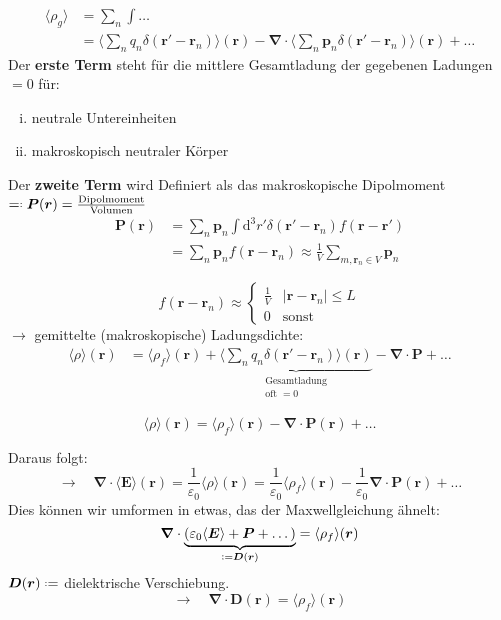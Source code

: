 \documentclass[titlepage,11pt,a4paper,ngerman]{report}
\newcommand*{\defeq}{\mathrel{\vcenter{\baselineskip0.5ex \lineskiplimit0pt \hbox{\scriptsize.}\hbox{\scriptsize.}}}=}
\newcommand*{\eqdef}{=\mathrel{\vcenter{\baselineskip0.5ex \lineskiplimit0pt \hbox{\scriptsize.}\hbox{\scriptsize.}}}}
\newcommand{\tx}[1]{\textrm{#1}}
\newcommand{\ub}[1]{\underbrace{#1}}
\newcommand{\dd}{\tx{d}}
\renewcommand{\vec}[1]{\boldsymbol{#1}}
\renewcommand{\epsilon}{\varepsilon}
\newcommand{\vabla}{\boldsymbol{\nabla}}
\newcommand{\frbox}[2]{\begin{tcolorbox}[colback=white,colframe=red!75!black,fonttitle=\bfseries,title=#1]#2\end{tcolorbox}}
\begin{document}
\begin{align*}
\langle \rho_g \rangle &= \sum_n \int \dots \\
&= \langle \sum_n q_n \delta(\vec{r}' - \vec{r}_n) \rangle (\vec{r}) - \vabla \cdot \langle \sum_n \vec{p}_n \delta(\vec{r}' - \vec{r}_n) \rangle(\vec{r}) + \dots
\end{align*}
Der \textbf{erste Term} steht für die mittlere Gesamtladung der gegebenen Ladungen $ = 0 $ für:
\begin{enumerate}[i)]
	\item neutrale Untereinheiten
	\item makroskopisch neutraler Körper
\end{enumerate}
Der \textbf{zweite Term} wird Definiert als das makroskopische Dipolmoment $ \eqdef \vec{P} (\vec{r}) = \frac{\tx{Dipolmoment}}{\tx{Volumen}} $
\begin{align}
\vec{P}(\vec{r}) &= \sum_n \vec{p}_n \int \dd^3r' \delta(\vec{r}' - \vec{r}_n) f(\vec{r} - \vec{r}')\\
&= \sum_n \vec{p}_n f(\vec{r} - \vec{r}_n) \approx \frac{1}{V} \sum_{m,\vec{r}_n \in V} \vec{p}_n
\end{align}


\begin{equation*}
f(\vec{r} - \vec{r}_n) \approx \left\{ \begin{array}{cc}
\frac{1}{V} & |\vec{r} - \vec{r}_n| \le L \\[5pt]
0 & \tx{sonst}
\end{array}\right.
\end{equation*}
$ \rightarrow $ gemittelte (makroskopische) Ladungsdichte:
\begin{align*}
\langle \rho \rangle (\vec{r}) &= \langle \rho_f \rangle(\vec{r}) + \ub{\langle \sum_n q_n \delta(\vec{r}' - \vec{r}_n) \rangle(\vec{r})}_{\substack{\tx{Gesamtladung} \\ \tx{oft } = 0}} - \vabla \cdot \vec{P} + \dots
\end{align*}
\frbox{Gemittelte makroskopische Ladungsverteilung}{
\begin{equation*}
\langle \rho \rangle (\vec{r}) = \langle \rho_f \rangle (\vec{r}) - \vabla \cdot \vec{P}(\vec{r}) + \dots
\end{equation*}
}
Daraus folgt:
\begin{equation*}
\rightarrow \quad \vabla \cdot \langle\vec{E} \rangle (\vec{r}) = \frac{1}{\epsilon_0} \langle\rho \rangle (\vec{r}) = \frac{1}{\epsilon_0} \langle \rho_f \rangle (\vec{r}) - \frac{1}{\epsilon_0} \vabla \cdot \vec{P}(\vec{r}) + \dots
\end{equation*}
Dies können wir umformen in etwas, das der Maxwellgleichung ähnelt:
\begin{equation*}
\vabla \cdot \ub{(\epsilon_0 \langle \vec{E} \rangle + \vec{P} + \dots)}_{\defeq \vec{D}(\vec{r})} = \langle \rho_f \rangle (\vec{r})
\end{equation*}
$ \vec{D}(\vec{r}) \defeq $ dielektrische Verschiebung.
\begin{equation*}
\rightarrow \quad \vabla \cdot \vec{D}(\vec{r}) = \langle \rho_f \rangle (\vec{r})
\end{equation*}
\end{document}
